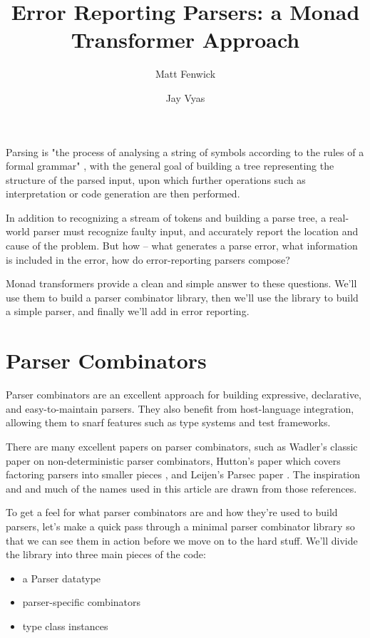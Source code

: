 \documentclass{tmr}
\title{Error Reporting Parsers:  a Monad Transformer Approach}
\author{Matt Fenwick\email{mfenwick100@gmail.com}}
\author{Jay Vyas\email{jayunit100@gmail.com}}
\begin{document}
\begin{introduction}
Parsing is "the process of analysing a string of symbols according to the rules
of a formal grammar" \cite{wikipedia_parsing}, with the general goal of building 
a tree representing the structure of the parsed input, upon which further 
operations such as interpretation or code generation are then performed.

In addition to recognizing a stream of tokens and building a parse tree, a
real-world parser must recognize faulty input, and accurately report the
location and cause of the problem.  But how -- what generates a parse error,
what information is included in the error, how do error-reporting parsers
compose?

Monad transformers provide a clean and simple answer to these questions.
We'll use them to build a parser combinator library, then we'll use the library
to build a simple parser, and finally we'll add in error reporting.
\end{introduction}




\section{Parser Combinators}
Parser combinators are an excellent approach for building expressive, 
declarative, and easy-to-maintain parsers.  They also benefit from host-language
integration, allowing them to snarf features such as type systems and test 
frameworks.

There are many excellent papers on parser combinators, such
as Wadler's classic paper \cite{wadler} on non-deterministic parser combinators, 
Hutton's paper which covers factoring parsers into smaller pieces \cite{hutton}, 
and Leijen's Parsec paper \cite{leijen}.  
The inspiration and and much of the names used in this article are drawn 
from those references.

To get a feel for what parser combinators are and how they're used to build
parsers, let's make a quick pass through a minimal parser combinator library 
so that we can see them in action before we move on to the hard stuff.  We'll 
divide the library into three main pieces of the code:
\begin{itemize}
 \item a Parser datatype
 \item parser-specific combinators
 \item type class instances
\end{itemize}
\end{document}
